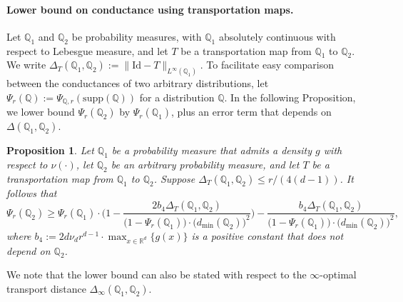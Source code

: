 \documentclass{article}
\newcommand{\Reals}{\mathbb{R}}
\newcommand{\1}{\mathbf{1}}
\newcommand{\Rd}{\Reals^d}
\newcommand{\Leb}{L}
\newcommand{\mbb}[1]{\mathbb{#1}}
\newtheorem{proposition}{Proposition}[section]
\theoremstyle{definition}
\theoremstyle{remark}
\begin{document}
\paragraph{Lower bound on conductance using transportation maps.}
Let $\mbb{Q}_1$ and $\mbb{Q}_2$ be probability measures, with $\mbb{Q}_1$ absolutely continuous with respect to Lebesgue measure, and let $T$ be a transportation map from $\mbb{Q}_1$ to $\mbb{Q}_2$. We write $\Delta_T(\mbb{Q}_1,\mbb{Q}_2) := \|\mathrm{Id} - T\|_{\Leb^{\infty}(\mbb{Q}_1)}$. To facilitate easy comparison between the conductances of two arbitrary distributions, let $\Psi_r(\mbb{Q}) := \Psi_{\mbb{Q},r}(\mathrm{supp}(\mbb{Q}))$ for a distribution $\mbb{Q}$. In the following Proposition, we lower bound $\Psi_r(\mbb{Q}_2)$ by $\Psi_r(\mbb{Q}_1)$, plus an error term that depends on $\Delta(\mbb{Q}_1,\mbb{Q}_2)$.
\begin{proposition}
	\label{prop:conductance_lb_transportation_distance}
	Let $\mbb{Q}_1$ be a probability measure that admits a density $g$ with respect to $\nu(\cdot)$, let $\mbb{Q}_2$ be an arbitrary probability measure, and let $T$ be a transportation map from $\mbb{Q}_1$ to $\mbb{Q}_2$. Suppose $\Delta_T(\mbb{Q}_1,\mbb{Q}_2) \leq r/(4(d - 1))$. It follows that
	\begin{equation}
	\label{eqn:conductance_lb_transportation_distance}
	\Psi_r(\mbb{Q}_2) \geq \Psi_r(\mbb{Q}_1) \cdot \biggl(1 - \frac{2b_4\Delta_T(\mbb{Q}_1,\mbb{Q}_2)}{\bigl(1 - \Psi_r(\mbb{Q}_1)\bigr) \cdot \bigl(d_{\min}(\mbb{Q}_2)\bigr)^2}\biggr) - \frac{b_4 \Delta_T(\mbb{Q}_1,\mbb{Q}_2)}{\bigl(1 - \Psi_r(\mbb{Q}_1)\bigr) \cdot \bigl(d_{\min}(\mbb{Q}_2)\bigr)^2},
	\end{equation}
	where $b_4 := 2d \nu_d r^{d - 1} \cdot \max_{x \in \Rd}\{g(x)\}$ is a positive constant that does not depend on $\mbb{Q}_2$. 
\end{proposition}
We note that the lower bound can also be stated with respect to the $\infty$-optimal transport distance $\Delta_{\infty}(\mbb{Q}_1,\mbb{Q}_2)$. 
\end{document}
